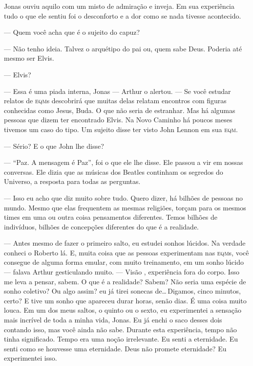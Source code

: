 Jonas ouviu aquilo com um misto de admiração e inveja. Em sua experiência tudo o que ele sentiu foi o desconforto e a dor como se nada tivesse acontecido.

--- Quem você acha que é o sujeito do capuz?

--- Não tenho ideia. Talvez o arquétipo do pai ou, quem sabe Deus. Poderia até mesmo ser Elvis.

--- Elvis?

--- Essa é uma piada interna, Jonas --- Arthur o alertou. --- Se você estudar relatos de \textsc{eqm}s\mudanca{,} descobrirá que muitas delas relatam encontros com figuras conhecidas como Jesus, Buda. O que não seria de estranhar. Mas há algumas pessoas que dizem ter encontrado Elvis. Na Novo Caminho\mudanca{,} há poucos meses\mudanca{,} tivemos um caso do tipo. Um sujeito disse ter visto John Lennon em sua \textsc{eqm}.

--- Sério? E o que John lhe disse?

--- ``Paz. A mensagem é Paz'', foi o que ele lhe disse. Ele passou a vir em nossas conversas. Ele dizia que as músicas dos Beatles continham os segredos do Universo, a resposta para todas as perguntas.

--- Isso eu acho que diz muito sobre tudo. Quero dizer, há bilhões de pessoas no mundo. Mesmo que elas frequentem as mesmas religiões, torçam para os mesmos times\mudanca{,} em uma ou outra coisa  pensamentos diferentes. Temos bilhões de indivíduos, bilhões de concepções diferentes do que é a realidade.

--- Antes mesmo de fazer o primeiro salto, eu estudei sonhos lúcidos. Na verdade\mudanca{,} conheci o Roberto lá. E, muita coisa que as pessoas experimentam nas \textsc{eqm}s, você consegue de alguma forma emular, com muito treinamento, em um sonho lúcido --- falava Arthur\mudanca{,} gesticulando muito. --- Visão , experiência fora do corpo. Isso me leva a pensar, sabem. O que é a realidade? Sabem? Não seria uma espécie de sonho coletivo? Ou algo assim?  eu já tirei sonecas de\ldots\,Digamos, cinco minutos, certo? E tive um sonho que apareceu durar horas, senão dias. É uma coisa muito louca. Em um dos meus saltos, o quinto ou o sexto, eu experimentei a sensação mais incrível de toda a minha vida, Jonas. Eu já enchi o saco desses dois contando isso, mas você ainda não sabe. Durante esta experiência, tempo não tinha significado. Tempo era uma noção irrelevante. Eu senti a eternidade. Eu senti como se houvesse uma eternidade. Deus não promete eternidade? Eu experimentei isso.

